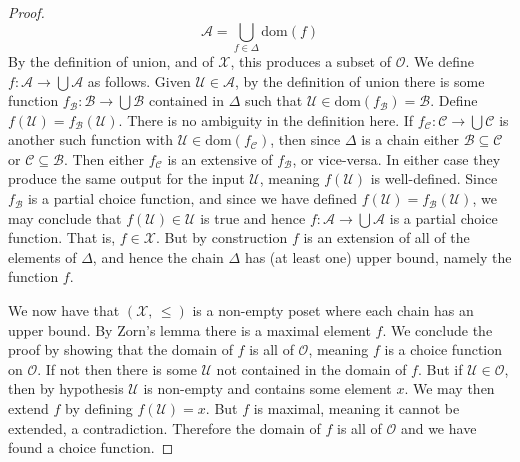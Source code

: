 \documentclass{article}
\theoremstyle{definition}
\begin{document}
\begin{proof}
                \begin{equation}
                    \mathcal{A}=
                    \bigcup_{f\in\Delta}\textrm{dom}(f)
                \end{equation}
                By the definition of union, and of $\mathcal{X}$, this produces
                a subset of $\mathcal{O}$. We
                define $f:\mathcal{A}\rightarrow\bigcup\mathcal{A}$ as follows.
                Given $\mathcal{U}\in\mathcal{A}$, by the definition of
                union there is some function
                $f_{\mathcal{B}}:\mathcal{B}\rightarrow\bigcup\mathcal{B}$
                contained in $\Delta$ such that
                $\mathcal{U}\in\textrm{dom}(f_{\mathcal{B}})=\mathcal{B}$.
                Define
                $f(\mathcal{U})=f_{\mathcal{B}}(\mathcal{U})$.
                There is no ambiguity in the definition here. If
                $f_{\mathcal{C}}:\mathcal{C}\rightarrow\bigcup\mathcal{C}$ is
                another such function with
                $\mathcal{U}\in\textrm{dom}(f_{\mathcal{C}})$, then since
                $\Delta$ is a chain either $\mathcal{B}\subseteq\mathcal{C}$ or
                $\mathcal{C}\subseteq\mathcal{B}$. Then either
                $f_{\mathcal{C}}$ is an extensive of $f_{\mathcal{B}}$, or
                vice-versa. In either case they produce the same output
                for the input $\mathcal{U}$, meaning $f(\mathcal{U})$ is
                well-defined. Since $f_{\mathcal{B}}$ is a partial choice
                function, and since we have defined
                $f(\mathcal{U})=f_{\mathcal{B}}(\mathcal{U})$, we may conclude
                that $f(\mathcal{U})\in\mathcal{U}$ is true and hence
                $f:\mathcal{A}\rightarrow\bigcup\mathcal{A}$ is a partial
                choice function. That is, $f\in\mathcal{X}$. But by
                construction $f$ is an extension of all of the elements of
                $\Delta$, and hence the chain $\Delta$ has (at least one)
                upper bound, namely the function $f$.
                \par\hfill\par
                We now have that $(\mathcal{X},\,\leq)$ is a non-empty poset
                where each chain has an upper bound. By Zorn's lemma there is
                a maximal element $f$. We conclude the proof by showing that
                the domain of $f$ is all of $\mathcal{O}$, meaning $f$ is a
                choice function on $\mathcal{O}$. If not then there is some
                $\mathcal{U}$ not contained in the domain of $f$. But if
                $\mathcal{U}\in\mathcal{O}$, then by hypothesis $\mathcal{U}$
                is non-empty and contains some element $x$. We may then extend
                $f$ by defining $f(\mathcal{U})=x$. But $f$ is maximal, meaning
                it cannot be extended, a contradiction. Therefore the domain of
                $f$ is all of $\mathcal{O}$ and we have found a choice function.
            \end{proof}
\end{document}
